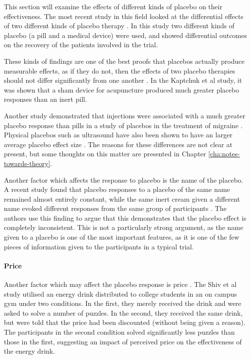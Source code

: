 This section will examine the effects of different kinds of placebo on their effectiveness. The most recent study in this field looked at the differential effects of two different kinds of placebo therapy \cite{Kaptchuk2006}. In this study two different kinds of placebo (a pill and a medical device) were used, and showed differential outcomes on the recovery of the patients involved in the trial. 

These kinds of findings are one of the best proofs  that placebos actually produce measurable effects, as if they do not, then the effects of two placebo therapies should not differ significantly from one another \cite{Kaptchuk2006}. In the Kaptchuk et al study, it was shown that a sham device for acupuncture produced much greater placebo responses than an inert pill. 

Another study demonstrated that injections were associated with a much greater placebo response than pills in a study of placebos in the treatment of migraine \cite{Craen2000}. Physical placebos such as ultrasound have also been shown to have an larger average placebo effect size \cite{Ernst1995b}.  The reasons for these differences are not clear at present, but some thoughts on this matter are presented in Chapter \ref{cha:notes-towards-theory}. 

Another factor which affects the response to placebo is the name of the placebo. A recent study found that placebo responses to a placebo of the same name remained almost entirely constant, while the same inert cream given a different name evoked different responses from the same group of participants \cite{Whalley2008}. The authors use this finding to argue that this demonstrates that the placebo effect is completely inconsistent. This is not a particularly strong argument, as the name given to a placebo is one of the most important features, as it is one of the few pieces of information given to the participants in a typical trial. 


\paragraph{Price}
\label{sec:price}

Another factor which may affect the placebo response is price \cite{Shiv2005a}. The Shiv et al study utilised an energy drink distributed to college students in an on campus gym under two conditions. In the first, they merely received the drink and were asked to solve a number of puzzles. In the second, they received the same drink, but were told that the price had been discounted (without being given a reason). The participants in the second condition solved significantly less puzzles than those in the first, suggesting an impact of perceived price on the effectiveness of the energy drink. 

